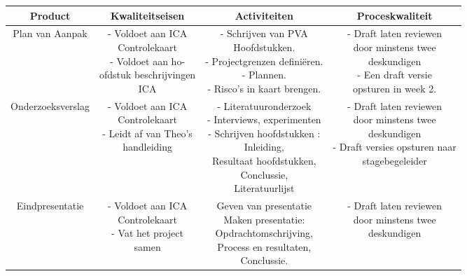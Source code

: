 \small
\begin{center}
 \begin{tabular}{|c c c c|} 
 
 \hline
 Product & Kwaliteitseisen & Activiteiten & Proceskwaliteit \\ [0.5ex] 
 \hline
 Plan van Aanpak & \makecell{
 - Voldoet aan ICA\\Controlekaart \cite{icaControl}\\
 - Voldoet aan ho-\\ofdstuk beschrijvingen\\ICA\cite{pvaTut}
 } & \makecell{
 - Schrijven van PVA\\Hoofdstukken.\\
 - Projectgrenzen definiëren. \\
 - Plannen.\\
 - Risco's in kaart brengen.
 } & \makecell{
 - Draft laten reviewen\\door minstens twee\\deskundigen\\
 - Een draft versie\\opsturen in week 2.
 } \\
 \hline

 \hline
 \makecell{
 Onderzoeksverslag\\
 } & \makecell{
 - Voldoet aan ICA\\Controlekaart \cite{icaControl}\\
 - Leidt af van Theo's\\ handleiding \cite{theoOnderzoek}
 } & \makecell{
 - Literatuuronderzoek \\
 - Interviews, experimenten \\
 - Schrijven hoofdstukken \cite{icaOnderzoek}:\\
 Inleiding,\\
 Resultaat hoofdstukken,\\
 Conclussie,\\
 Literatuurlijst
 } & \makecell{
 - Draft laten reviewen\\door minstens twee\\deskundigen\\
 - Draft versies opsturen naar\\ stagebegeleider
 } \\
 \hline
 
 \hline
 Eindpresentatie & \makecell{
 - Voldoet aan ICA\\Controlekaart \cite{icaControl}\\
 - Vat het project\\samen
 } & \makecell{
 Geven van presentatie\\
 Maken presentatie:\\
 Opdrachtomschrijving,\\
 Process en resultaten,\\
 Conclussie.
 } & \makecell{
 - Draft laten reviewen\\door minstens twee\\deskundigen
 } \\
 \hline
 

\end{tabular}
\end{center}
